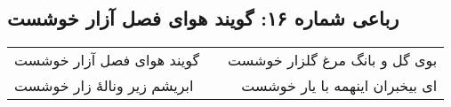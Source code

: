 \begin{center}
\section*{رباعی شماره ۱۶: گویند هوای فصل آزار خوشست}
\label{sec:016}
\begin{longtable}{l p{0.5cm} r}
گویند هوای فصل آزار خوشست
&&
بوی گل و بانگ مرغ گلزار خوشست
\\
ابریشم زیر ونالهٔ زار خوشست
&&
ای بیخبران اینهمه با یار خوشست
\\
\end{longtable}
\end{center}
